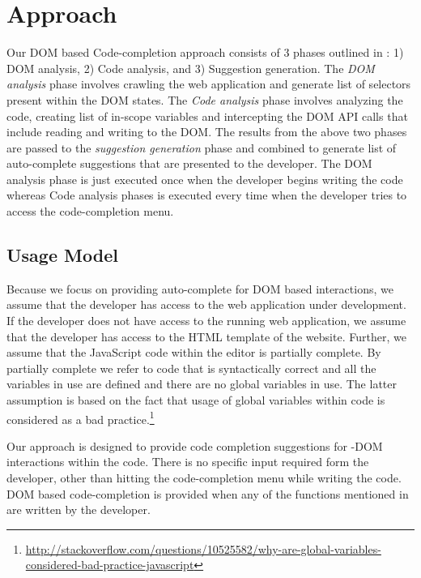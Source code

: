 \section{Approach}
\label{Sec:Approach}

	Our DOM based Code-completion approach consists of 3 phases outlined in : 1) DOM analysis, 2) Code analysis, and 3) Suggestion generation. The \emph{DOM analysis} phase involves crawling the web application and generate list of \css selectors present within the DOM states. The \emph{Code analysis} phase involves analyzing the \javascript code, creating list of in-scope variables and intercepting the DOM API calls that include reading and writing to the DOM. The results from the above two phases are passed to the \emph{suggestion generation} phase and combined to generate list of auto-complete suggestions that are presented to the developer. The DOM analysis phase is just executed once when the developer begins writing the code whereas Code analysis phases is executed every time when the developer tries to access the code-completion menu.
	
	\subsection{Usage Model}
	\label{Sec:Model}
		Because we focus on providing auto-complete for DOM based interactions, we assume that the developer has access to the web application under development. If the developer does not have access to the running web application, we assume that the developer has access to the HTML template of the website. Further, we assume that the JavaScript code within the editor is partially complete. By partially complete we refer to \javascript code that is syntactically correct and all the variables in use are defined and there are no global variables in use. The latter assumption is based on the fact that usage of global variables within \javascript code is considered as a bad practice.\footnote{\url{http://stackoverflow.com/questions/10525582/why-are-global-variables-considered-bad-practice-javascript}}
		
		Our approach is designed to provide code completion suggestions for \javascript-DOM interactions within the \javascript code. There is no specific input required form the developer, other than hitting the code-completion menu while writing the code. DOM based code-completion is provided when any of the  functions mentioned in  are written by the developer.
	
